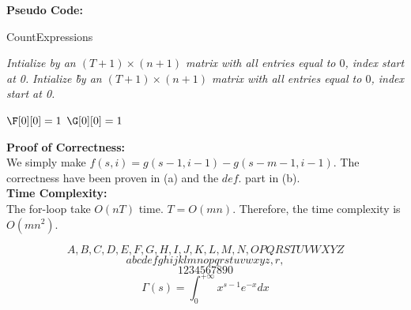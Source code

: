\documentclass[10.5pt]{article}
\newenvironment{main idea}{\textbf{Main Idea: }}{}
\newenvironment{prcor}{\textbf{Proof of Correctness: }\\}{}
\newenvironment{pseudo}{\textbf{Pseudo Code: }\\}{}
\newenvironment{complexity}{\textbf{Time Complexity: }\\}{}
\theoremstyle{remark}
\begin{document}
\begin{pseudo}
	\begin{algorithm}[H]
		\DontPrintSemicolon


		\caption{CountExpressions}
		\BlankLine
		\emph{Intialize \F by an \((T + 1) \times (n + 1)\) matrix with all entries equal to \(0\), index start at 0.}\;
		\emph{Intialize \G by an \((T + 1) \times (n + 1)\) matrix with all entries equal to \(0\), index start at 0.}\;

		\(\F[0][0] = 1\)\;
		\(\G[0][0] = 1\)\;
		\Return{\(\F[T][n]\)}
	\end{algorithm}
\end{pseudo}
\begin{prcor}
	We simply make \(f(s,i) = g(s - 1, i - 1) - g(s -m - 1, i - 1)\). The correctness have been proven in (a) and the \(def. \) part in (b).\\
\end{prcor}
\begin{complexity}
	The for-loop take \(O(nT)\) time. \(T = O(mn)\). Therefore, the time complexity is \(O(mn^2)\).
\end{complexity}

\[
	A,B,C,D,E,F,G,H,I,J,K,L,M,N,OPQRSTUVWXYZ
\]
\[abcdefghijklmnopqrstuvwxyz, r, \]
\[1234567890\]
\[\Gamma(s)=\int_0^{+\infty}x^{s-1}e^{-x}dx\]
\end{document}
